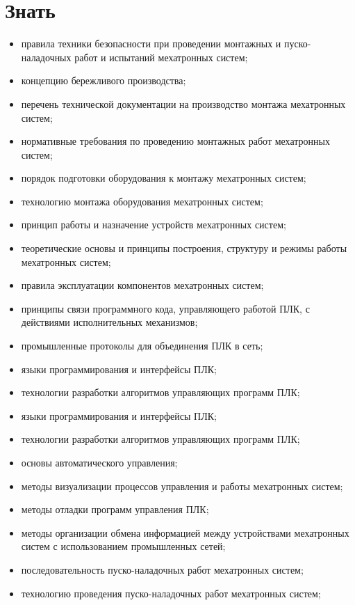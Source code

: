 \section*{Знать}
\begin{itemize}
    \item правила техники безопасности при проведении монтажных и пуско-наладочных работ и испытаний мехатронных систем;
    \item концепцию бережливого производства;
    \item перечень технической документации на производство монтажа мехатронных систем;
    \item нормативные требования по проведению монтажных работ мехатронных систем;
    \item порядок подготовки оборудования к монтажу мехатронных систем;
    \item технологию монтажа оборудования мехатронных систем;
    \item принцип работы и назначение устройств мехатронных систем;
    \item теоретические основы и принципы построения, структуру и режимы работы мехатронных систем;
    \item правила эксплуатации компонентов мехатронных систем;
    \item принципы связи программного кода, управляющего работой ПЛК, с действиями исполнительных механизмов;
    \item промышленные протоколы для объединения ПЛК в сеть;
    \item языки программирования и интерфейсы ПЛК;
    \item технологии разработки алгоритмов управляющих программ ПЛК;
    \item языки программирования и интерфейсы ПЛК;
    \item технологии разработки алгоритмов управляющих программ ПЛК;
    \item основы автоматического управления;
    \item методы визуализации процессов управления и работы мехатронных систем;
    \item методы отладки программ управления ПЛК;
    \item методы организации обмена информацией между устройствами мехатронных систем с использованием промышленных сетей;
    \item последовательность пуско-наладочных работ мехатронных систем;
    \item технологию проведения пуско-наладочных работ мехатронных систем;

\end{itemize}
